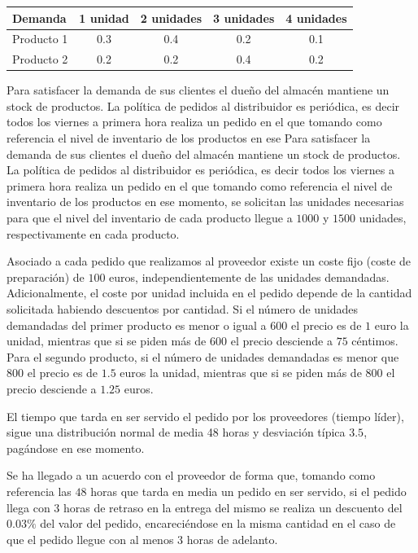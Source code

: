 \documentclass[a4paper,12pt]{article}
\begin{document}
	\begin{table}[H]
		\centering
		\begin{tabular}{|l||c|c|c|c|}
			\hline
			Demanda    & 1 unidad & 2 unidades & 3 unidades & 4 unidades \\ \hline \hline
			Producto 1 & 0.3      & 0.4        & 0.2        & 0.1        \\ \hline
			Producto 2 & 0.2      & 0.2        & 0.4        & 0.2        \\ \hline
		\end{tabular}
	\end{table}

	Para satisfacer la demanda de sus clientes el dueño del almacén mantiene un
 stock de productos. La política de pedidos al distribuidor es periódica, es decir
 todos los viernes a primera hora realiza un pedido en el que tomando como
referencia el nivel de inventario de los productos en ese Para satisfacer la demanda de sus clientes el dueño del almacén mantiene un
 stock de productos. La política de pedidos al distribuidor es periódica, es decir
todos los viernes a primera hora realiza un pedido en el que tomando como
referencia el nivel de inventario de los productos en ese momento, se solicitan
las unidades necesarias para que el nivel del inventario de cada producto llegue
a $1000$ y $1500$ unidades, respectivamente en cada producto.

	
	Asociado a cada pedido que realizamos al proveedor existe un coste fijo (coste
de preparación) de $100$ euros, independientemente de las unidades
demandadas. Adicionalmente, el coste por unidad incluida en el pedido depende de la cantidad solicitada habiendo descuentos por cantidad. Si el número de
unidades demandadas del primer producto es menor o igual a $600$ el precio es
de $1$ euro la unidad, mientras que si se piden más de $600$ el precio desciende a
$75$ céntimos. Para el segundo producto, si el número de unidades demandadas
es menor que $800$ el precio es de $1.5$ euros la unidad, mientras que si se piden
más de $800$ el precio desciende a $1.25$ euros.
	
	El tiempo que tarda en ser servido el pedido por los proveedores (tiempo líder),
sigue una distribución normal de media 48 horas y desviación típica $3.5$,
pagándose en ese momento.
	
	Se ha llegado a un acuerdo con el proveedor de forma que, tomando como
referencia las $48$ horas que tarda en media un pedido en ser servido, si el pedido
llega con $3$ horas de retraso en la entrega del mismo se realiza un descuento del $0.03\%$ del valor del pedido, encareciéndose en la misma cantidad en el caso de
que el pedido llegue con al menos $3$ horas de adelanto.
\end{document}
